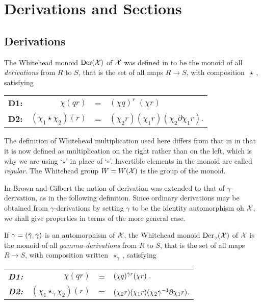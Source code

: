 
\section{Derivations and Sections} \label{sect:der-sec}


\subsection{Derivations} \label{subsec:der} 

The Whitehead monoid  $\mathrm{Der}(\mathcal{X})$  of  $\mathcal{X}$ 
was defined in \cite{W-48b} 
to be the monoid of all {\it derivations}
from $R$ to $S$, that is the set of all maps  $R \to S$,
with composition  $\ \star \ $, satisfying
\begin{center}
\begin{tabular}{c r c l }
\textbf{D1:}  &  $\chi(qr)$              &  = 
           & $(\chi q)^{r} \; (\chi r)$  \\
\textbf{D2:}  &  $(\chi_1 \star \chi_2)(r)$  &  =
           & $(\chi_2 r)(\chi_1 r)(\chi_2 \partial \chi_1 r)$. 
\end{tabular}
\end{center}

\noindent
The definition of Whitehead multiplication used here 
differs from that in \cite{alp:wens-ijac} in that it is now 
defined as multiplication on the right rather than on the left, 
which is why we are using `$\star$' in place of `$\circ$'. 
Invertible elements in the monoid are called \emph{regular}. 
  
The Whitehead group $W = W(\mathcal{X})$ is the group of the monoid. 

In Brown and Gilbert \cite{brow:gilb} the notion of derivation 
was extended to that of $\gamma$-derivation, as in the following definition. 
Since ordinary derivations may be obtained from $\gamma$-derivations 
by setting $\gamma$ to be the identity automorphism oh $\mathcal{X}$, 
we shall give properties in terms of the more general case. 

\begin{defn} 
If $\gamma = (\ddot{\gamma},\dot{\gamma})$ is an automorphism of $\mathcal{X}$,
the Whitehead monoid $\mathrm{Der}_{\gamma}(\mathcal{X})$  of  $\mathcal{X}$ 
is the monoid of all $gamma$-{\it derivations}
from $R$ to $S$, that is the set of all maps  $R \to S$,
with composition written  $\ \star_{\gamma} \ $, satisfying
\begin{center}
\begin{tabular}{c r c l }
\textbf{\emph{D1:}}  &  $\chi(qr)$              &  = 
           & $(\chi q)^{\dot{\gamma} r}(\chi r)~.$  \\
\textbf{\emph{D2:}}  &  $(\chi_1 \star_{\gamma} \chi_2)(r)$  &  =
           & $(\chi_2 r)(\chi_1 r)(\chi_2 \dot{\gamma}^{-1} \partial \chi_1 r)$. 
\end{tabular}
\end{center}
\end{defn}

